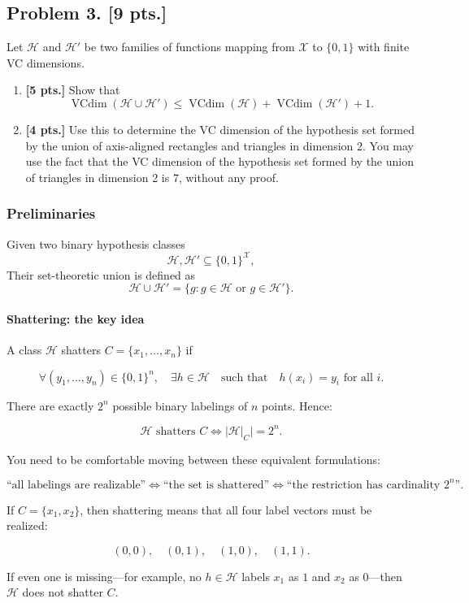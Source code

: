 \documentclass[11pt,a4paper]{article}
\DeclareMathOperator{\VCdim}{VCdim}
\theoremstyle{definition}
\begin{document}
\subsection{Problem 3. [9 pts.]}
Let $\mathcal{H}$ and $\mathcal{H}'$ be two families of functions mapping from $\mathcal{X}$ to $\{0, 1\}$ with finite VC dimensions.
\begin{enumerate}[label=(\alph*)]
    \item \textbf{[5 pts.]} Show that
    \[
    \VCdim(\mathcal{H} \cup \mathcal{H}') \le \VCdim(\mathcal{H}) + \VCdim(\mathcal{H}') + 1.
    \]
    \item \textbf{[4 pts.]} Use this to determine the VC dimension of the hypothesis set formed by the union of axis-aligned rectangles and triangles in dimension 2. You may use the fact that the VC dimension of the hypothesis set formed by the union of triangles in dimension 2 is 7, without any proof.
\end{enumerate}

\subsubsection{Preliminaries}

Given two binary hypothesis classes
\[
\mathcal{H}, \mathcal{H}' \subseteq \{0, 1\}^{\mathcal{X}},
\]
Their set-theoretic union is defined as 
\[
\mathcal{H} \cup \mathcal{H}' = \{g : g \in \mathcal{H} \text{ or } g \in \mathcal{H}'\}.
\]

\paragraph{Shattering: the key idea}

A class $\mathcal{H}$ shatters $C = \{x_1, \dots, x_n\}$ if

$$\forall (y_1, \dots, y_n) \in \{0, 1\}^n, \quad \exists h \in \mathcal{H} \quad \text{such that} \quad h(x_i) = y_i \text{ for all } i.$$

There are exactly $2^n$ possible binary labelings of $n$ points. Hence:

$$\mathcal{H} \text{ shatters } C \iff |\mathcal{H}|_C| = 2^n.$$

You need to be comfortable moving between these equivalent formulations:


\[
\text{``all labelings are realizable''} \iff \text{``the set is shattered''} \iff \text{``the restriction has cardinality } 2^n\text{''}.
\]

\begin{example}
    

If $C = \{x_1, x_2\}$, then shattering means that all four label vectors must be realized:

$$(0, 0), \quad (0, 1), \quad (1, 0), \quad (1, 1).$$

If even one is missing—for example, no $h \in \mathcal{H}$ labels $x_1$ as $1$ and $x_2$ as $0$—then $\mathcal{H}$ does not shatter $C$.
\end{example}
\end{document}
